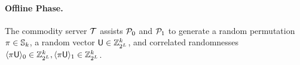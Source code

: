 \paragraph{Offline Phase.}
The commodity server $\tt$ assists $\pp_0$ and $\pp_1$ to generate a random permutation $\pi\in\mathbb{S}_k$, a random vector $\mathsf{U}\in\mathbb{Z}^k_{2^L}$, and correlated randomnesses $\langle \pi \mathsf{U} \rangle_0\in\mathbb{Z}^k_{2^L}, \langle \pi \mathsf{U} \rangle_1\in\mathbb{Z}^k_{2^L}$.

\iffalse
\begin{protocol}[!t]
		\begin{algorithmic}[1]
\REQUIRE $\pp_0$ inputs $\sigma$ and $\pp_1$ inputs $\xvec$ if $\type == \raw$; otherwise $\pp_0$ inputs $\sigma, \l\xvec\r_0$ and $\pp_1$ inputs $\l\xvec\r_1$ if $\type == \shared$.
\ENSURE $\pp_0$ gets $\l \sigma(\xvec)\r_0$ and $\pp_1$ gets $\l \sigma(\xvec)\r_1$.
		\STATE {\color{gray}\COMMENT{Offline Phase: Generate Correlated Randomness}}
		\STATE $\tt, \pp_0$: Get $h, \langle \uvec\rangle_0\leftarrow\prf_0(\mathsf{key}_0 ) $ 
		\STATE $\tt, \pp_1$: Get $\bvec\leftarrow\prf_1(\mathsf{key}_1 ) $
		\STATE $\tt$: Get $\langle \uvec\rangle_1=h(\bvec)-\langle \uvec\rangle_0$ and send $\langle \uvec\rangle_1$ to $\pp_1$
		\STATE {\color{gray}\COMMENT{Online Phase: Reconstruct $\sigma(\xvec)$ in 1 Round}}
		\STATE $\pp_0$: Get $\delta_{\sigma} = \sigma \cdot h^{-1}$ and {send $\delta_{\sigma}$} to $\pp_1$\label{pro:op:l6}
			\IF{ $\type == \raw $}
		\STATE $\pp_1$: Get $\delta_{\xvec} = \xvec-\bvec$ and {send $\delta_{\xvec}$} to $\pp_0$ \label{pro:op:l8}
		\STATE $\pp_0$: Get $\l \sigma(\xvec)\r_0={\color{cyan}\sigma(\delta_{\xvec}) + \delta_{\sigma} (\langle \uvec\rangle_0)}$ \label{pro:op:l9}
	\ENDIF
	\IF{$\type == \shared$} 
		\STATE $\pp_1$: Get $\delta_{\l \xvec \r_1} = \l \xvec \r_1-\bvec$, {send $\delta_{\l \xvec \r_1}$} to $\pp_0$\label{pro:op:l12}
		 \STATE $\pp_0$: Get $\l \sigma(\xvec)\r_0 = {\color{cyan} \sigma(\delta_{\langle \xvec\rangle_1}) + \delta_{\sigma} (\langle \uvec\rangle_0) + \sigma (\langle \xvec \rangle_0)}$\label{pro:op:l13}
	\ENDIF
		\STATE $\pp_1$: Get $\l \sigma(\xvec)\r_1= {\color{ao}\delta_{\sigma} (\langle \uvec\rangle_1)}$ \label{pro:op:l15}
		\end{algorithmic}
	\caption{$\Pi_{\ssp}$: Oblivious Permutation}\label{fig::sspcons:main}%
\end{protocol}
 \fi

